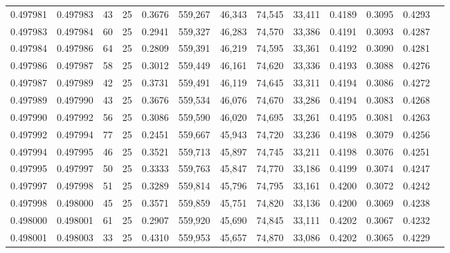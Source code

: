 \begin{tabular}{rrrrrrrrrrrrr}
0.497981 & 0.497983 &    43 &  25 &                                     0.3676 & 559,267 &  46,343 &  74,545 &  33,411 & 0.4189 & 0.3095 & 0.4293 \\
0.497983 & 0.497984 &    60 &  25 &                                     0.2941 & 559,327 &  46,283 &  74,570 &  33,386 & 0.4191 & 0.3093 & 0.4287 \\
0.497984 & 0.497986 &    64 &  25 &                                     0.2809 & 559,391 &  46,219 &  74,595 &  33,361 & 0.4192 & 0.3090 & 0.4281 \\
0.497986 & 0.497987 &    58 &  25 &                                     0.3012 & 559,449 &  46,161 &  74,620 &  33,336 & 0.4193 & 0.3088 & 0.4276 \\
0.497987 & 0.497989 &    42 &  25 &                                     0.3731 & 559,491 &  46,119 &  74,645 &  33,311 & 0.4194 & 0.3086 & 0.4272 \\
0.497989 & 0.497990 &    43 &  25 &                                     0.3676 & 559,534 &  46,076 &  74,670 &  33,286 & 0.4194 & 0.3083 & 0.4268 \\
0.497990 & 0.497992 &    56 &  25 &                                     0.3086 & 559,590 &  46,020 &  74,695 &  33,261 & 0.4195 & 0.3081 & 0.4263 \\
0.497992 & 0.497994 &    77 &  25 &                                     0.2451 & 559,667 &  45,943 &  74,720 &  33,236 & 0.4198 & 0.3079 & 0.4256 \\
0.497994 & 0.497995 &    46 &  25 &                                     0.3521 & 559,713 &  45,897 &  74,745 &  33,211 & 0.4198 & 0.3076 & 0.4251 \\
0.497995 & 0.497997 &    50 &  25 &                                     0.3333 & 559,763 &  45,847 &  74,770 &  33,186 & 0.4199 & 0.3074 & 0.4247 \\
0.497997 & 0.497998 &    51 &  25 &                                     0.3289 & 559,814 &  45,796 &  74,795 &  33,161 & 0.4200 & 0.3072 & 0.4242 \\
0.497998 & 0.498000 &    45 &  25 &                                     0.3571 & 559,859 &  45,751 &  74,820 &  33,136 & 0.4200 & 0.3069 & 0.4238 \\
0.498000 & 0.498001 &    61 &  25 &                                     0.2907 & 559,920 &  45,690 &  74,845 &  33,111 & 0.4202 & 0.3067 & 0.4232 \\
0.498001 & 0.498003 &    33 &  25 &                                     0.4310 & 559,953 &  45,657 &  74,870 &  33,086 & 0.4202 & 0.3065 & 0.4229 \\

\end{tabular}
